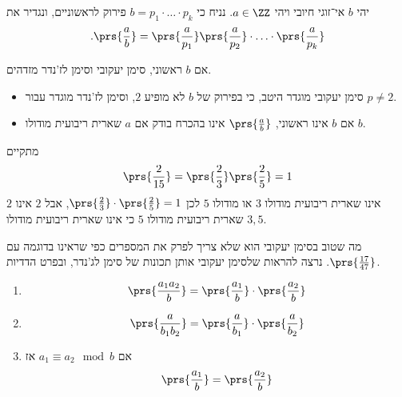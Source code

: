 \documentclass[a4paper,10pt,twoside,openany]{book}
\begin{document}
\begin{definition}
יהי
$b$
אי־זוגי חיובי ויהי
$a \in \ZZ$.
נניח כי
$b = p_1 \cdot \ldots \cdot p_k$
פירוק לראשוניים, ונגדיר את
\begin{align*}
\text{.} \prs{\frac{a}{b}} = \prs{\frac{a}{p_1}} \prs{\frac{a}{p_2}} \cdot \ldots \cdot \prs{\frac{a}{p_k}}
\end{align*}
\end{definition}
\begin{remark}
אם
$b$
ראשוני, סימן יעקובי וסימן לז'נדר מזדהים.
\end{remark}
\begin{remark}
\begin{itemize}
\item סימן יעקובי מוגדר היטב, כי בפירוק של
$b$
לא מופיע
$2$,
וסימן לז'נדר מוגדר עבור
$p \neq 2$.
\item אם
$b$
אינו ראשוני,
$\prs{\frac{a}{b}}$
אינו בהכרח בודק אם
$a$
שארית ריבועית מודולו
$b$.
\end{itemize}
\end{remark}

\begin{example}
מתקיים
\[\prs{\frac{2}{15}} = \prs{\frac{2}{3}}\prs{\frac{2}{5}} = 1\]
$2$
אינו שארית ריבועית מודולו
$3$
או מודולו
$5$
לכן
$\prs{\frac{2}{3}}\cdot\prs{\frac{2}{5}} = 1$,
אבל
$2$
אינו שארית ריבועית מודולו
$5$
כי אינו שארית ריבועית מודולו
$3,5$.
\end{example}

\begin{remark}
מה שטוב בסימן יעקובי הוא שלא צריך לפרק את המספרים כפי שראינו בדוגמה עם
$\prs{\frac{17}{47}}$.
נרצה להראות שלסימן יעקובי אותן תכונות של סימן לג'נדר, ובפרט הדדיות.
\end{remark}

\begin{proposition}
\begin{enumerate}
\item \[\prs{\frac{a_1 a_2}{b}} = \prs{\frac{a_1}{b}} \cdot \prs{\frac{a_2}{b}}\]
\item \[\prs{\frac{a}{b_1 b_2}} = \prs{\frac{a}{b_1}} \cdot\prs{\frac{a}{b_2}}\]
\item אם
$a_1 \equiv a_2 \mod{b}$
אז
\[\prs{\frac{a_1}{b}} = \prs{\frac{a_2}{b}}\]
\end{enumerate}
\end{proposition}
\end{document}
